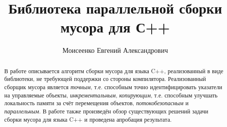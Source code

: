 \title{Библиотека параллельной сборки мусора для С++}


\author{Моисеенко Евгений Александрович}



\maketitle

\newcommand{\code}[1]{\textsf{#1}}

\begin{abstract}
В работе описывается алгоритм сборки мусора для языка C++, 
реализованный в виде библиотеки, не требующей поддержки со стороны компилятора. 
Реализованный сборщик мусора является 
\emph{точным}, т.е. способным точно идентифицировать указатели на управляемые объекты, 
\emph{инкрементальным}, 
\emph{копирующим}, т.е. способным улучшать локальность памяти за счёт перемещения объектов, 
\emph{потокобезопасным} и \emph{параллельным}. 
В работе также произведён обзор существующих решений задачи сборки мусора для языка C++
и проведена апробация результата.
\end{abstract}








